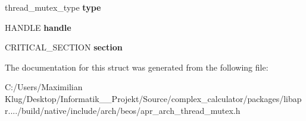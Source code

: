 \begin{DoxyCompactItemize}
\mbox{\label{structapr__thread__mutex__t_a3b96f37b2e946e6308b4cac3d72fecc7}} 
thread\+\_\+mutex\+\_\+type {\bfseries type}
\item 
\mbox{\label{structapr__thread__mutex__t_a7849918c2f84bd5bc5d79309707abe3c}} 
H\+A\+N\+D\+LE {\bfseries handle}
\item 
\mbox{\label{structapr__thread__mutex__t_a67f2e859a45c82fb49b78ff4a68032f8}} 
C\+R\+I\+T\+I\+C\+A\+L\+\_\+\+S\+E\+C\+T\+I\+ON {\bfseries section}
\end{DoxyCompactItemize}


The documentation for this struct was generated from the following file\+:\begin{DoxyCompactItemize}
\item 
C\+:/\+Users/\+Maximilian Klug/\+Desktop/\+Informatik\+\_\+\_\+\+Projekt/\+Source/complex\+\_\+calculator/packages/libapr..../build/native/include/arch/beos/apr\+\_\+arch\+\_\+thread\+\_\+mutex.\+h\end{DoxyCompactItemize}

